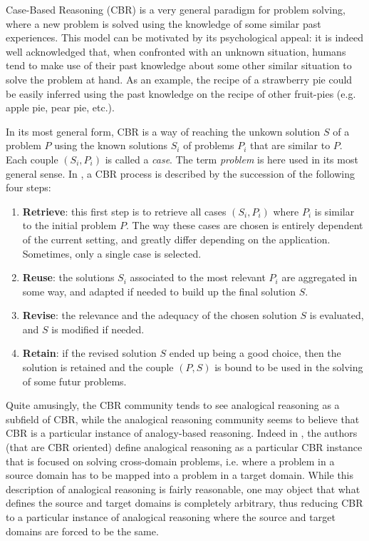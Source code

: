 Case-Based Reasoning (CBR) is a very general paradigm for problem solving,
where a new problem is solved using the knowledge of some similar past
experiences. This model can be motivated by its psychological appeal: it is
indeed well acknowledged that, when confronted with an unknown situation,
humans tend to make use of their past knowledge about some other similar
situation to solve the problem at hand. As an example, the recipe of a
strawberry pie could be easily inferred using the past knowledge on the recipe
of other fruit-pies (e.g. apple pie, pear pie, etc.).

In its most general form, CBR is a way of reaching the unkown solution $S$ of a
problem $P$ using the known solutions $S_i$ of problems $P_i$ that are similar
to $P$. Each couple $(S_i, P_i)$ is called a \textit{case}. The term
\textit{problem} is here used in its most general sense.  In \cite{AamPla94}, a
CBR process is described by the succession of the following four steps:
\begin{enumerate}
  \item \textbf{Retrieve}: this first step is to retrieve all cases $(S_i,
    P_i)$ where $P_i$ is similar to the initial problem $P$. The way these
    cases are chosen is entirely dependent of the current setting, and greatly
    differ depending on the application. Sometimes, only a single case  is
    selected.
  \item \textbf{Reuse}: the solutions $S_i$ associated to the most relevant
    $P_i$ are aggregated in some way, and adapted if needed to build up the
    final solution $S$.
  \item \textbf{Revise}: the relevance and the adequacy of the chosen solution
    $S$ is evaluated, and $S$ is modified if needed.
  \item \textbf{Retain}: if the revised solution $S$ ended up being a good
    choice, then the solution is retained and the couple $(P, S)$ is bound to
    be used in the solving of some futur problems.
\end{enumerate}

Quite amusingly, the CBR community tends to see analogical reasoning as a
subfield of CBR, while the analogical reasoning community seems to believe that
CBR is a particular instance of analogy-based reasoning. Indeed in
\cite{AamPla94}, the authors (that are CBR oriented) define analogical
reasoning as a particular CBR instance that is focused on solving cross-domain
problems, i.e. where a problem in a source domain has to be mapped into a
problem in a target domain. While this description of analogical reasoning is
fairly reasonable, one may object that what defines the source and target
domains is completely arbitrary, thus reducing CBR to a particular instance of
analogical reasoning where the source and target domains are forced to be the
same.

